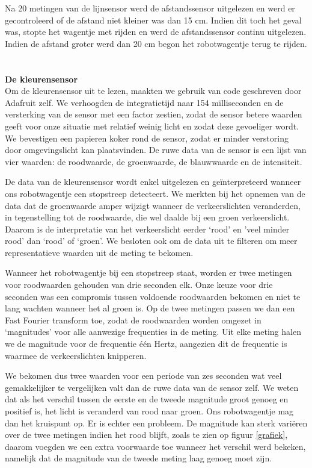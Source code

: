 \documentclass[a4paper,kulak]{kulakarticle}
\begin{document}
Na 20 metingen van de lijnsensor werd de afstandssensor uitgelezen en werd er gecontroleerd of de afstand niet kleiner was dan 15 cm. Indien dit toch het geval was, stopte het wagentje met rijden en werd de afstandssensor continu uitgelezen. Indien de afstand groter werd dan 20 cm begon het robotwagentje terug te rijden. \\ \\
\\
\textbf{\large De kleurensensor}\
\\
Om de kleurensensor uit te lezen, maakten we gebruik van code geschreven door Adafruit zelf. We verhoogden de integratietijd naar 154 milliseconden en de versterking van de sensor met een factor zestien, zodat de sensor betere waarden geeft voor onze situatie met relatief weinig licht en zodat deze gevoeliger wordt. We bevestigen een papieren koker rond de sensor, zodat er minder verstoring door omgevingslicht kan plaatsvinden. De ruwe data van de sensor is een lijst van vier waarden: de roodwaarde, de groenwaarde, de blauwwaarde en de intensiteit. 

De data van de kleurensensor wordt enkel uitgelezen en geïnterpreteerd wanneer ons robotwagentje een stopstreep detecteert. We merkten bij het opnemen van de data dat de groenwaarde amper wijzigt wanneer de verkeerslichten veranderden, in tegenstelling tot de roodwaarde, die wel daalde bij een groen verkeerslicht. Daarom is de interpretatie van het verkeerslicht eerder `rood' en 'veel minder rood' dan `rood' of `groen'. We besloten ook om de data uit te filteren om meer representatieve waarden uit de meting te bekomen.

Wanneer het robotwagentje bij een stopstreep staat, worden er twee metingen voor roodwaarden gehouden van drie seconden elk. Onze keuze voor drie seconden was een compromis tussen voldoende roodwaarden bekomen en niet te lang wachten wanneer het al groen is. Op de twee metingen passen we dan een Fast Fourier transform toe, zodat de roodwaarden worden omgezet in `magnitudes' voor alle aanwezige frequenties in de meting. Uit elke meting halen we de magnitude voor de frequentie één Hertz, aangezien dit de frequentie is waarmee de verkeerslichten knipperen.

We bekomen dus twee waarden voor een periode van zes seconden wat veel gemakkelijker te vergelijken valt dan de ruwe data van de sensor zelf. We weten dat als het verschil tussen de eerste en de tweede magnitude groot genoeg en positief is, het licht is veranderd van rood naar groen. Ons robotwagentje mag dan het kruispunt op. Er is echter een probleem. De magnitude kan sterk variëren over de twee metingen indien het rood blijft, zoals te zien op figuur \ref{grafiek}, daarom voegden we een extra voorwaarde toe wanneer het verschil werd bekeken, namelijk dat de magnitude van de tweede meting laag genoeg moet zijn.
\end{document}
